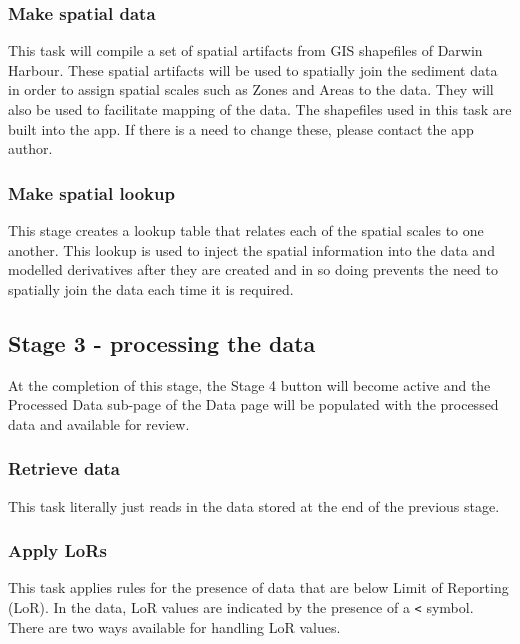 \documentclass[
  8pt,
  a4paper]{article}
\begin{document}
\subsubsection{Make spatial data}\label{make-spatial-data}

This task will compile a set of spatial artifacts from GIS shapefiles of
Darwin Harbour. These spatial artifacts will be used to spatially join
the sediment data in order to assign spatial scales such as Zones and
Areas to the data. They will also be used to facilitate mapping of the
data. The shapefiles used in this task are built into the app. If there
is a need to change these, please contact the app author.

\subsubsection{Make spatial lookup}\label{make-spatial-lookup}

This stage creates a lookup table that relates each of the spatial
scales to one another. This lookup is used to inject the spatial
information into the data and modelled derivatives after they are
created and in so doing prevents the need to spatially join the data
each time it is required.

\subsection{Stage 3 - processing the
data}\label{stage-3---processing-the-data}

At the completion of this stage, the Stage 4 button will become active
and the Processed Data sub-page of the Data page will be populated with
the processed data and available for review.

\subsubsection{Retrieve data}\label{retrieve-data}

This task literally just reads in the data stored at the end of the
previous stage.

\subsubsection{Apply LoRs}\label{apply-lors}

This task applies rules for the presence of data that are below Limit of
Reporting (LoR). In the data, LoR values are indicated by the presence
of a \texttt{\textless{}} symbol. There are two ways available for
handling LoR values.
\end{document}
